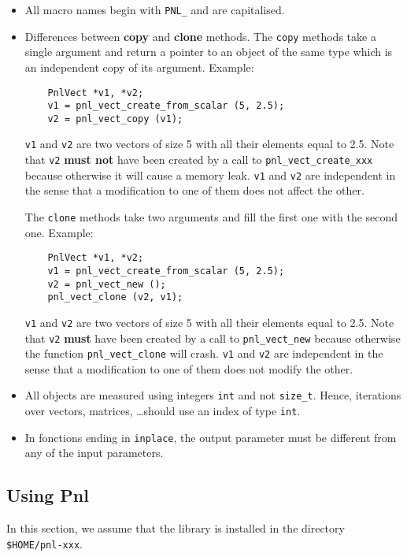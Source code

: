 \documentclass[a4paper,11pt,twoside]{article}
\begin{document}
\begin{itemize}
  \item All macro names begin with \verb!PNL_! and are capitalised.

  \item Differences between \textbf{copy} and \textbf{clone} methods.
    The \verb!copy! methods take a single argument and return a pointer to an object
    of the same type which is an independent copy of its argument. 
    Example:
    \begin{verbatim}
    PnlVect *v1, *v2;
    v1 = pnl_vect_create_from_scalar (5, 2.5);
    v2 = pnl_vect_copy (v1);
    \end{verbatim}
    \verb!v1! and \verb!v2! are two vectors of size 5 with all their elements
    equal to 2.5. Note that \verb!v2! {\bf must not} have been created by a call
    to \verb!pnl_vect_create_xxx! because otherwise it will cause a memory leak.
    \verb!v1! and \verb!v2! are independent in the sense that a modification to
    one of them does not affect the other.

    The \verb!clone! methods take two arguments and fill the first one with the
    second one. 
    Example:
    \begin{verbatim}
    PnlVect *v1, *v2;
    v1 = pnl_vect_create_from_scalar (5, 2.5);
    v2 = pnl_vect_new ();
    pnl_vect_clone (v2, v1);
    \end{verbatim}
    \verb!v1! and \verb!v2! are two vectors of size 5 with all their elements
    equal to 2.5. Note that \verb!v2! {\bf must} have been created by a call to
    \verb!pnl_vect_new! because otherwise the function
    \verb!pnl_vect_clone!  will crash.  \verb!v1! and \verb!v2! are independent
    in the sense that a modification to one of them does not modify the other.


  \item All objects are measured using integers \verb!int! and not
    \verb!size_t!. Hence, iterations over vectors, matrices, \dots should use an
    index of type \verb!int!.

  \item In fonctions ending in \verb!inplace!, the output parameter must be different
    from any of the input parameters.
\end{itemize}


\subsection{Using Pnl}

In this section, we assume that the library is installed in the directory
\verb!$HOME/pnl-xxx!.
\end{document}

